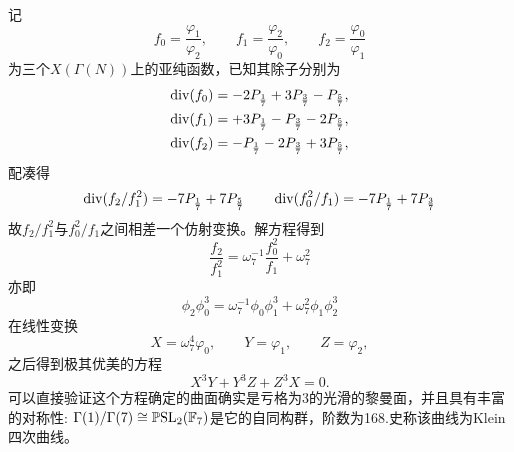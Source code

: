 记$$f_0=\frac{\varphi_1}{\varphi_2}, \qquad f_1=\frac{\varphi_2}{\varphi_0}, \qquad f_2=\frac{\varphi_0}{\varphi_1}$$
为三个$X(\Gamma(N))$上的亚纯函数，已知其除子分别为
\begin{equation*}
\begin{aligned}
\operatorname{\operatorname{div}} (f_0)=-2P_{\frac{1}{7}}+3P_{\frac{3}{7}}-P_{\frac{5}{7}},\\
\operatorname{\operatorname{div}} (f_1)=+3P_{\frac{1}{7}}-P_{\frac{3}{7}}-2P_{\frac{5}{7}},\\
\operatorname{\operatorname{div}} (f_2)=-P_{\frac{1}{7}}-2P_{\frac{3}{7}}+3P_{\frac{5}{7}},
\end{aligned}
\end{equation*}
配凑得
$$\operatorname{\operatorname{div}}(f_2/f_1^2)=-7P_{\frac{1}{7}}+7P_{\frac{5}{7}} \qquad \operatorname{\operatorname{div}}(f_0^2/f_1)=-7P_{\frac{1}{7}}+7P_{\frac{3}{7}}$$
故$f_2/f_1^2$与$f_0^2/f_1$之间相差一个仿射变换。解方程得到
$$\frac{f_2}{f_1^2}= \omega_7^{-1}\frac{f_0^2}{f_1}+\omega_7^2$$
亦即
$$\phi_2\phi_0^3=\omega_7^{-1}\phi_0\phi_1^3 +\omega_7^{2}\phi_1\phi_2^3$$
在线性变换
$$X=\omega_7^4\varphi_0, \qquad Y=\varphi_1, \qquad Z= \varphi_2,$$之后得到极其优美的方程$$X^3Y+Y^3Z+Z^3X=0.$$可以直接验证这个方程确定的曲面确实是亏格为$3$的光滑的黎曼面，并且具有丰富的对称性: $\Gamma(1)/\Gamma(7) \cong \operatorname{\mathbb{P}SL}_2(\mathbb{F}_7)$是它的自同构群，阶数为168.史称该曲线为Klein四次曲线。
\nocite{nash2014klein}\nocite{hilton1991catalan}\nocite{duke2005continued}
\nocite{green1978on}\nocite{klein1892vorlesungen}\nocite{fricke1897vorlesungen}\nocite{shimura1971introduction}\nocite{shurman1997geometry}\nocite{anvari2009automorphisms}\nocite{mumford1995algebraic}
%
%

